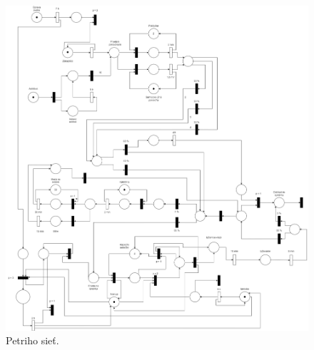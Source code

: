 \begin{figure}[H]
  \centering
  \includegraphics[width=1\textwidth]{petriho-siet.png}
  \caption{Petriho sieť.}
  \label{fig:petri}
\end{figure}
